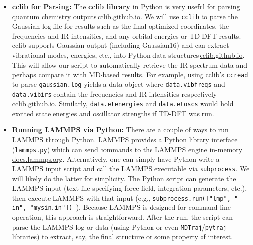 \documentclass[11pt]{article}
\begin{document}
\begin{itemize}
  \item \textbf{cclib for Parsing:} The \textbf{cclib library} in Python is very useful for parsing quantum chemistry outputs\,\href{https://cclib.github.io/\#:\~:text=cclib\%20is\%20an\%20open\%20source,contained\%20in\%20output\%20files\%2C\%20specifically}{cclib.github.io}. We will use \texttt{cclib} to parse the Gaussian log file for results such as the final optimized coordinates, the frequencies and IR intensities, and any orbital energies or TD-DFT results. cclib supports Gaussian output (including Gaussian16) and can extract vibrational modes, energies, etc., into Python data structures\,\href{https://cclib.github.io/\#:\~:text=Many\%20types\%20of\%20output\%20data,also\%20provided\%20for\%20interpreting\%20the}{cclib.github.io}. This will allow our script to automatically retrieve the IR spectrum data and perhaps compare it with MD-based results. For example, using cclib’s \texttt{ccread} to parse \texttt{gaussian.log} yields a data object where \texttt{data.vibfreqs} and \texttt{data.vibirs} contain the frequencies and IR intensities respectively\,\href{https://cclib.github.io/\#:\~:text=Many\%20types\%20of\%20output\%20data,also\%20provided\%20for\%20interpreting\%20the}{cclib.github.io}. Similarly, \texttt{data.etenergies} and \texttt{data.etoscs} would hold excited state energies and oscillator strengths if TD-DFT was run.
  \item \textbf{Running LAMMPS via Python:} There are a couple of ways to run LAMMPS through Python. LAMMPS provides a Python library interface (\texttt{lammps.py}) which can send commands to the LAMMPS engine in-memory\,\href{https://docs.lammps.org/Intro_overview.html\#:\~:text=Through\%20a\%20C\%20language\%20API,into\%20other\%20executables\%20are\%20provided}{docs.lammps.org}. Alternatively, one can simply have Python write a LAMMPS input script and call the LAMMPS executable via \texttt{subprocess}. We will likely do the latter for simplicity. The Python script can generate the LAMMPS input (text file specifying force field, integration parameters, etc.), then execute LAMMPS with that input (e.g., \texttt{subprocess.run(["lmp", "-in", "mysin.in"]) }). Because LAMMPS is designed for command-line operation, this approach is straightforward. After the run, the script can parse the LAMMPS log or data (using Python or even \texttt{MDTraj}/\texttt{pytraj} libraries) to extract, say, the final structure or some property of interest.

\end{itemize}
\end{document}
